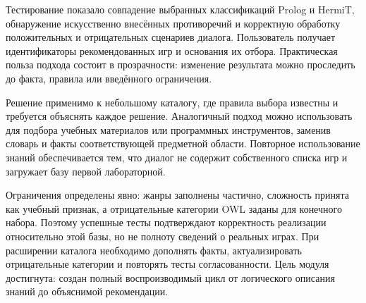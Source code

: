 Тестирование показало совпадение выбранных классификаций Prolog и HermiT,
обнаружение искусственно внесённых противоречий и корректную обработку
положительных и отрицательных сценариев диалога. Пользователь получает
идентификаторы рекомендованных игр и основания их отбора.
Практическая польза подхода состоит в прозрачности: изменение результата
можно проследить до факта, правила или введённого ограничения.

Решение применимо к небольшому каталогу, где правила выбора известны
и требуется объяснять каждое решение. Аналогичный подход можно использовать
для подбора учебных материалов или программных инструментов, заменив словарь
и факты соответствующей предметной области. Повторное использование знаний
обеспечивается тем, что диалог не содержит собственного списка игр и загружает
базу первой лабораторной.

Ограничения определены явно: жанры заполнены частично, сложность принята
как учебный признак, а отрицательные категории OWL заданы для конечного набора.
Поэтому успешные тесты подтверждают корректность реализации относительно
этой базы, но не полноту сведений о реальных играх. При расширении каталога
необходимо дополнять факты, актуализировать отрицательные категории и
повторять тесты согласованности. Цель модуля достигнута: создан полный
воспроизводимый цикл от логического описания знаний до объяснимой рекомендации.
